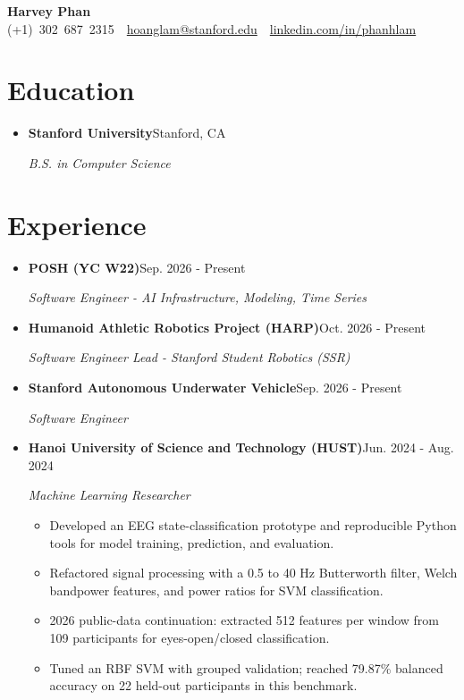 \documentclass[letterpaper,10pt]{article}
\newcommand{\resumeItem}[1]{\item {#1}}
\newcommand{\resumeSubheading}[4]{
  \vspace{-1pt}\item
  {\textbf{#1}\hfill #2\par}
  {\textit{#3}\hfill \textit{#4}\par}\vspace{-3pt}
}
\newcommand{\resumeSubHeadingListStart}{\begin{itemize}[leftmargin=0.15in,label={},itemsep=7pt,topsep=4pt,parsep=0pt]}
\newcommand{\resumeSubHeadingListEnd}{\end{itemize}}
\newcommand{\resumeItemListStart}{\begin{itemize}[leftmargin=0.20in,itemsep=3pt,topsep=4pt,parsep=0pt]}
\newcommand{\resumeItemListEnd}{\end{itemize}\vspace{-4pt}}
\begin{document}
\fontsize{11}{13.4}\selectfont
\begin{center}
  {\fontsize{20}{23}\selectfont\textbf{Harvey Phan}} \\[3pt]
  {\fontsize{10}{11.5}\selectfont\mbox{(+1) 302 687 2315 \textbar\
  \href{mailto:hoanglam@stanford.edu}{hoanglam@stanford.edu} \textbar\
  \href{https://linkedin.com/in/phanhlam}{linkedin.com/in/phanhlam}}}
\end{center}
\vspace{-9pt}
\section{Education}
\resumeSubHeadingListStart
\resumeSubheading{Stanford University}{Stanford, CA}{B.S. in Computer Science}{}
\resumeSubHeadingListEnd
\section{Experience}
\resumeSubHeadingListStart
\resumeSubheading{POSH (YC W22)}{Sep. 2026 - Present}{Software Engineer - AI Infrastructure, Modeling, Time Series}{}
\resumeSubheading{Humanoid Athletic Robotics Project (HARP)}{Oct. 2026 - Present}{Software Engineer Lead - Stanford Student Robotics (SSR)}{}
\resumeSubheading{Stanford Autonomous Underwater Vehicle}{Sep. 2026 - Present}{Software Engineer}{}
\resumeSubheading{Hanoi University of Science and Technology (HUST)}{Jun. 2024 - Aug. 2024}{Machine Learning Researcher}{}
\resumeItemListStart
\resumeItem{Developed an EEG state-classification prototype and reproducible Python tools for model training, prediction, and evaluation.}
\resumeItem{Refactored signal processing with a 0.5 to 40 Hz Butterworth filter, Welch bandpower features, and power ratios for SVM classification.}
\resumeItem{2026 public-data continuation: extracted 512 features per window from 109 participants for eyes-open/closed classification.}
\resumeItem{Tuned an RBF SVM with grouped validation; reached 79.87\% balanced accuracy on 22 held-out participants in this benchmark.}
\resumeItemListEnd
\resumeSubHeadingListEnd
\end{document}
